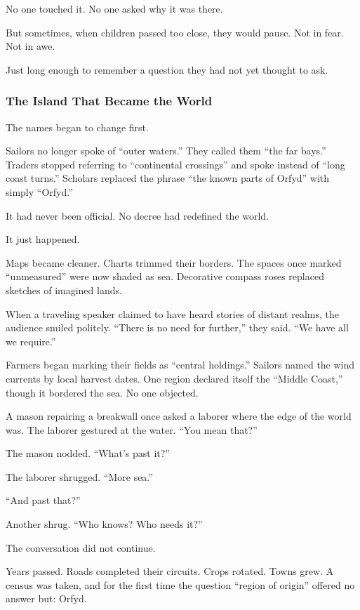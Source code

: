 \documentclass[12pt]{article}
\begin{document}
No one touched it. No one asked why it was there.

But sometimes, when children passed too close, they would pause. Not in fear. Not in awe.

Just long enough to remember a question they had not yet thought to ask.

\dotfill

\subsubsection{The Island That Became the World}

The names began to change first.

Sailors no longer spoke of ``outer waters.'' They called them ``the far bays.'' Traders stopped referring to ``continental crossings'' and spoke instead of ``long coast turns.'' Scholars replaced the phrase ``the known parts of Orfyd'' with simply ``Orfyd.''

It had never been official. No decree had redefined the world.

It just happened.

Maps became cleaner. Charts trimmed their borders. The spaces once marked ``unmeasured'' were now shaded as sea. Decorative compass roses replaced sketches of imagined lands.

When a traveling speaker claimed to have heard stories of distant realms, the audience smiled politely. ``There is no need for further,'' they said. ``We have all we require.''

Farmers began marking their fields as ``central holdings.'' Sailors named the wind currents by local harvest dates. One region declared itself the ``Middle Coast,'' though it bordered the sea. No one objected.

A mason repairing a breakwall once asked a laborer where the edge of the world was. The laborer gestured at the water. ``You mean that?''

The mason nodded. ``What’s past it?''

The laborer shrugged. ``More sea.''

``And past that?''

Another shrug. ``Who knows? Who needs it?''

The conversation did not continue.

Years passed. Roads completed their circuits. Crops rotated. Towns grew. A census was taken, and for the first time the question ``region of origin'' offered no answer but: Orfyd.
\end{document}
